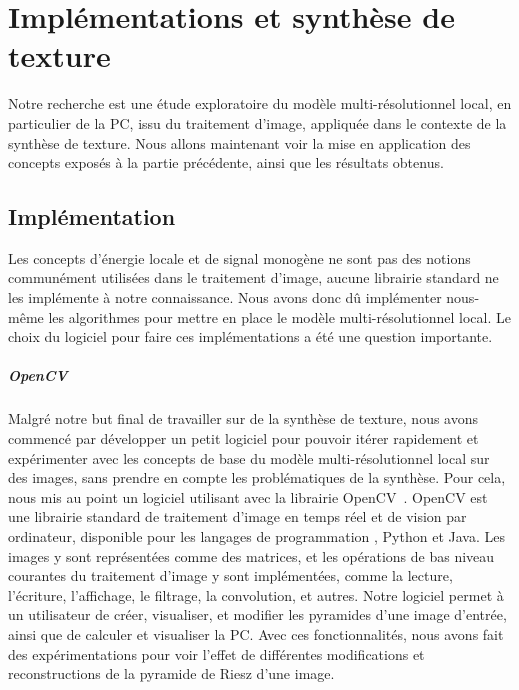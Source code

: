 \chapter{Implémentations et synthèse de texture}
\label{chap:chapitre2}

Notre recherche est une étude exploratoire du modèle multi-résolutionnel local, en particulier de la PC, issu du traitement d'image, appliquée dans le contexte de la synthèse de texture. Nous allons maintenant voir la mise en application des concepts exposés à la partie précédente, ainsi que les résultats obtenus.

\section{Implémentation}

Les concepts d'énergie locale et de signal monogène ne sont pas des notions communément utilisées dans le traitement d'image, aucune librairie standard ne les implémente à notre connaissance. Nous avons donc dû implémenter nous-même les algorithmes pour mettre en place le modèle multi-résolutionnel local. Le choix du logiciel pour faire ces implémentations a été une question importante.


\paragraph{OpenCV}

Malgré notre but final de travailler sur de la synthèse de texture, nous avons commencé par développer un petit logiciel pour pouvoir itérer rapidement et expérimenter avec les concepts de base du modèle multi-résolutionnel local sur des images, sans prendre en compte les problématiques de la synthèse. Pour cela, nous mis au point un logiciel utilisant \cpp avec la librairie OpenCV~\cite{opencv_library}. OpenCV est une librairie standard de traitement d'image en temps réel et de vision par ordinateur, disponible pour les langages de programmation \cpp, Python et Java. Les images y sont représentées comme des matrices, et les opérations de bas niveau courantes du traitement d'image y sont implémentées, comme la lecture, l'écriture, l'affichage, le filtrage, la convolution, et autres.  Notre logiciel permet à un utilisateur de créer, visualiser, et modifier les pyramides d'une image d'entrée, ainsi que de calculer et visualiser la PC. Avec ces fonctionnalités, nous avons fait des expérimentations pour voir l'effet de différentes modifications et reconstructions de la pyramide de Riesz d'une image.

